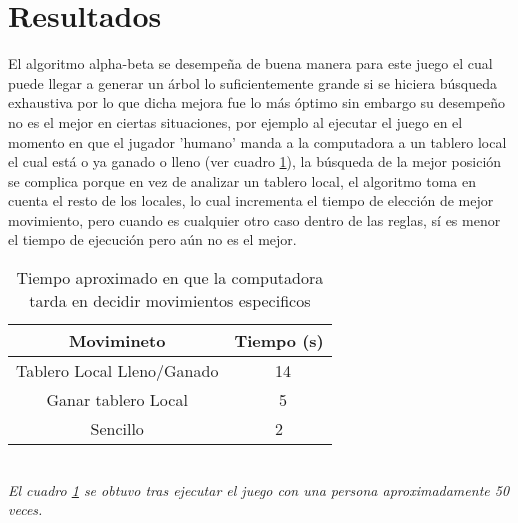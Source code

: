 \documentclass[runningheads]{llncs}
\begin{document}
\section{Resultados}
El algoritmo alpha-beta se desempeña de buena manera para este juego el cual puede llegar a generar un árbol lo suficientemente grande si se hiciera búsqueda exhaustiva por lo que dicha mejora fue lo más óptimo sin embargo su desempeño no es el mejor en ciertas situaciones, por ejemplo al ejecutar el juego en el momento en que el jugador 'humano' manda a la computadora a un tablero local el cual está o ya ganado o lleno (ver cuadro \ref{tab:1}), la búsqueda de la mejor posición se complica porque en vez de analizar un tablero local, el algoritmo toma en cuenta el resto de los locales, lo cual incrementa el tiempo de elección de mejor movimiento, pero cuando es cualquier otro caso dentro de las reglas, sí es menor el tiempo de ejecución pero aún no es el mejor.
\begin{table}
\begin{center}
\begin{tabular}{| c | c |}
Movimineto & Tiempo (s) \\ \hline
Tablero Local Lleno/Ganado & ~14  \\
Ganar tablero Local & ~5\\
Sencillo &  2 \\ \hline
\end{tabular}
\caption{Tiempo aproximado en que la computadora tarda en decidir movimientos especificos}
\label{tab:1}
\end{center}
\end{table}
\\
\textit{El cuadro \ref{tab:1} se obtuvo tras ejecutar el juego con una persona aproximadamente 50 veces.}
\end{document}
